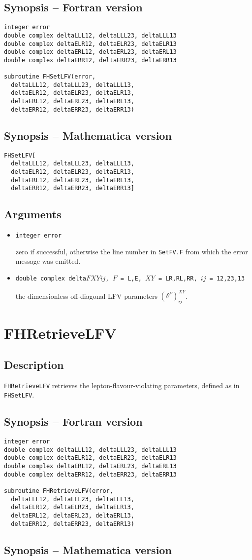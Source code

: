 \documentclass[12pt,a4paper]{report}
\newcommand{\CODE}[1]{\texttt{#1}}
\newcommand{\VARIN}[1]{%
  \item[\fbox{\scriptsize\textsc{in}}]
  \CODE{#1}\par}
\newcommand{\VAROUT}[1]{%
  \item[\fbox{\scriptsize\textsc{out}}]
  \CODE{#1}\par}
\newcommand{\ROUTINE}[1]{\pagebreak
  \section*{#1}%
  \addcontentsline{toc}{section}{#1}}
\newcommand{\DESCRIPTION}{\subsection*{Description}}
\newcommand{\FSYNOPSIS}{\subsection*{Synopsis -- Fortran version}}
\newcommand{\MSYNOPSIS}{\subsection*{Synopsis -- Mathematica version}}
\newcommand{\ARGUMENTS}{\subsection*{Arguments}\begin{itemize}}
\newcommand{\ENDARGUMENTS}{\end{itemize}}
\begin{document}
\FSYNOPSIS

\begin{verbatim}
integer error
double complex deltaLLL12, deltaLLL23, deltaLLL13
double complex deltaELR12, deltaELR23, deltaELR13
double complex deltaERL12, deltaERL23, deltaERL13
double complex deltaERR12, deltaERR23, deltaERR13

subroutine FHSetLFV(error,
  deltaLLL12, deltaLLL23, deltaLLL13,
  deltaELR12, deltaELR23, deltaELR13,
  deltaERL12, deltaERL23, deltaERL13,
  deltaERR12, deltaERR23, deltaERR13)
\end{verbatim}

\MSYNOPSIS

\begin{verbatim}
FHSetLFV[
  deltaLLL12, deltaLLL23, deltaLLL13,
  deltaELR12, deltaELR23, deltaELR13,
  deltaERL12, deltaERL23, deltaERL13,
  deltaERR12, deltaERR23, deltaERR13]
\end{verbatim}

\ARGUMENTS

\VAROUT{integer error}
zero if successful, otherwise the line number in \CODE{SetFV.F} 
from which the error message was emitted.

\VARIN{double complex delta$F$$XY$$ij$, $F$ = L,E, $XY$ = LR,RL,RR,
$ij$ = 12,23,13}

the dimensionless off-diagonal LFV parameters $(\delta^F)^{XY}_{ij}$.

\ENDARGUMENTS


\ROUTINE{FHRetrieveLFV}

\DESCRIPTION

\CODE{FHRetrieveLFV} retrieves the lepton-flavour-violating parameters,
defined as in \CODE{FHSetLFV}.

\FSYNOPSIS

\begin{verbatim}
integer error
double complex deltaLLL12, deltaLLL23, deltaLLL13
double complex deltaELR12, deltaELR23, deltaELR13
double complex deltaERL12, deltaERL23, deltaERL13
double complex deltaERR12, deltaERR23, deltaERR13

subroutine FHRetrieveLFV(error,
  deltaLLL12, deltaLLL23, deltaLLL13,
  deltaELR12, deltaELR23, deltaELR13,
  deltaERL12, deltaERL23, deltaERL13,
  deltaERR12, deltaERR23, deltaERR13)
\end{verbatim}

\MSYNOPSIS
\end{document}
